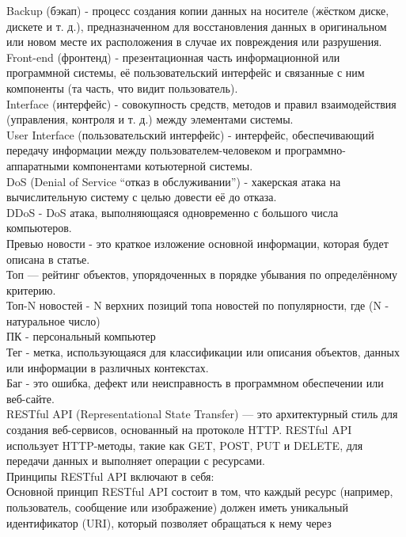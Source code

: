 \begin{enumerate}
\begin{enumerate}[label=1.\arabic*]
        Backup (бэкап) - процесс создания копии данных на носителе (жёстком диске, дискете и т. д.), предназначенном для восстановления данных в оригинальном или новом месте их расположения в случае их повреждения или разрушения. \\
        Front-end (фронтенд) - презентационная часть информационной или программной системы, её пользовательский интерфейс и связанные с ним компоненты (та часть, что видит пользователь). \\
        Interface (интерфейс) - совокупность средств, методов и правил взаимодействия (управления, контроля и т. д.) между элементами системы. \\
        User Interface (пользовательский интерфейс) - интерфейс, обеспечивающий передачу информации между пользователем-человеком и программно-аппаратными компонентами котьютерной системы. \\
        DoS (Denial of Service ``отказ в обслуживании'') - хакерская атака на вычислительную систему с целью довести её до отказа. \\
        DDoS - DoS атака, выполняющаяся одновременно с большого числа компьютеров. \\
        Превью новости - это краткое изложение основной информации, которая будет описана в статье. \\
        Топ — рейтинг объектов, упорядоченных в порядке убывания по определённому критерию. \\
        Топ-N новостей - N верхних позиций топа новостей по популярности, где (N - натуральное число) \\
        ПК - персональный компьютер \\
        Тег - метка, использующаяся для классификации или описания объектов, данных или информации в различных контекстах. \\
        Баг - это ошибка, дефект или неисправность в программном обеспечении или веб-сайте.\\
        RESTful API (Representational State Transfer) — это архитектурный стиль для создания веб-сервисов, основанный на
        протоколе HTTP. RESTful API использует HTTP-методы, такие как GET, POST, PUT и DELETE, для передачи данных и
        выполняет операции с ресурсами. \\
        Принципы RESTful API включают в себя:\\
        \quad Основной принцип RESTful API состоит в том, что каждый ресурс (например, пользователь, сообщение или
        изображение) должен иметь уникальный идентификатор (URI), который позволяет обращаться к нему через

\end{enumerate}
\end{enumerate}
